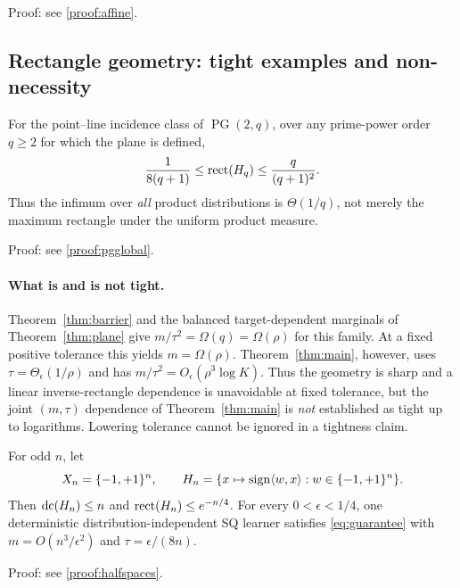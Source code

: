 \noindent Proof: see \cref{proof:affine}.\par


\subsection{Rectangle geometry: tight examples and non-necessity}\label{sec:landscape}

\begin{theorem}\label{thm:pgglobal}
For the point--line incidence class of $\operatorname{PG}(2,q)$, over any prime-power order $q\ge2$ for which the plane is defined,
\[
 \frac1{8(q+1)}\le\operatorname{rect}(H_q)\le\frac{q}{(q+1)^2}.
\]
Thus the infimum over \emph{all} product distributions is $\Theta(1/q)$, not merely the maximum rectangle under the uniform product measure.
\end{theorem}

\noindent Proof: see \cref{proof:pgglobal}.\par


\paragraph{What is and is not tight.}
Theorem~\ref{thm:barrier} and the balanced target-dependent marginals of Theorem~\ref{thm:plane} give $m/\tau^2=\Omega(q)=\Omega(\rho)$ for this family. At a fixed positive tolerance this yields $m=\Omega(\rho)$. Theorem~\ref{thm:main}, however, uses $\tau=\Theta_\epsilon(1/\rho)$ and has $m/\tau^2=O_\epsilon(\rho^3\log K)$. Thus the geometry is sharp and a linear inverse-rectangle dependence is unavoidable at fixed tolerance, but the joint $(m,\tau)$ dependence of Theorem~\ref{thm:main} is \emph{not} established as tight up to logarithms. Lowering tolerance cannot be ignored in a tightness claim.


\begin{theorem}\label{thm:halfspaces}
For odd $n$, let
\[
 X_n=\{-1,+1\}^n,\qquad
 H_n=\{x\mapsto\operatorname{sign}\langle w,x\rangle:w\in\{-1,+1\}^n\}.
\]
Then $\operatorname{dc}(H_n)\le n$ and $\operatorname{rect}(H_n)\le e^{-n/4}$. For every $0<\epsilon<1/4$, one deterministic distribution-independent SQ learner satisfies \eqref{eq:guarantee} with $m=O(n^3/\epsilon^2)$ and $\tau=\epsilon/(8n)$.
\end{theorem}

\noindent Proof: see \cref{proof:halfspaces}.\par


